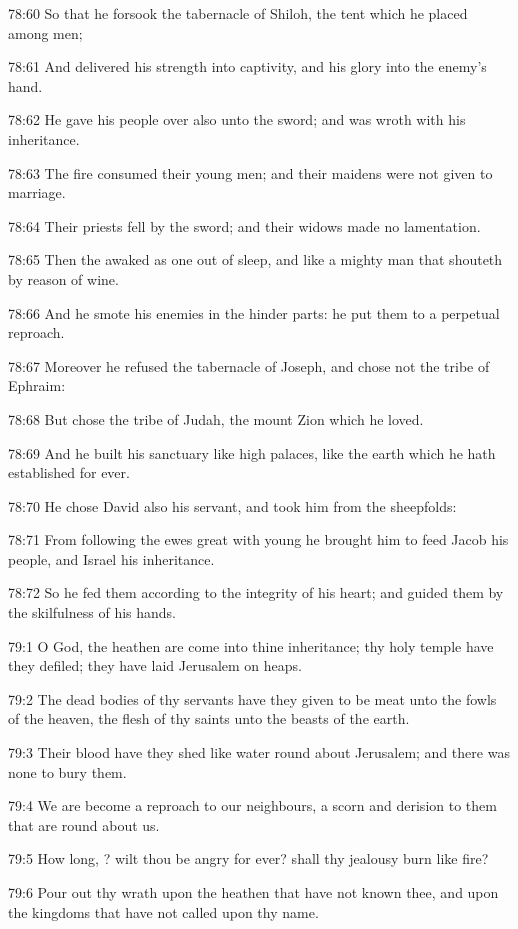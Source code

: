 78:60 So that he forsook the tabernacle of Shiloh, the tent which he
placed among men;

78:61 And delivered his strength into captivity, and his glory into
the enemy's hand.

78:62 He gave his people over also unto the sword; and was wroth with
his inheritance.

78:63 The fire consumed their young men; and their maidens were not
given to marriage.

78:64 Their priests fell by the sword; and their widows made no
lamentation.

78:65 Then the \LORD awaked as one out of sleep, and like a mighty man
that shouteth by reason of wine.

78:66 And he smote his enemies in the hinder parts: he put them to a
perpetual reproach.

78:67 Moreover he refused the tabernacle of Joseph, and chose not the
tribe of Ephraim:

78:68 But chose the tribe of Judah, the mount Zion which he loved.

78:69 And he built his sanctuary like high palaces, like the earth
which he hath established for ever.

78:70 He chose David also his servant, and took him from the
sheepfolds:

78:71 From following the ewes great with young he brought him to feed
Jacob his people, and Israel his inheritance.

78:72 So he fed them according to the integrity of his heart; and
guided them by the skilfulness of his hands.



79:1 O God, the heathen are come into thine inheritance; thy holy
temple have they defiled; they have laid Jerusalem on heaps.

79:2 The dead bodies of thy servants have they given to be meat unto
the fowls of the heaven, the flesh of thy saints unto the beasts of
the earth.

79:3 Their blood have they shed like water round about Jerusalem; and
there was none to bury them.

79:4 We are become a reproach to our neighbours, a scorn and derision
to them that are round about us.

79:5 How long, \LORD? wilt thou be angry for ever? shall thy jealousy
burn like fire?

79:6 Pour out thy wrath upon the heathen that have not known thee, and
upon the kingdoms that have not called upon thy name.

